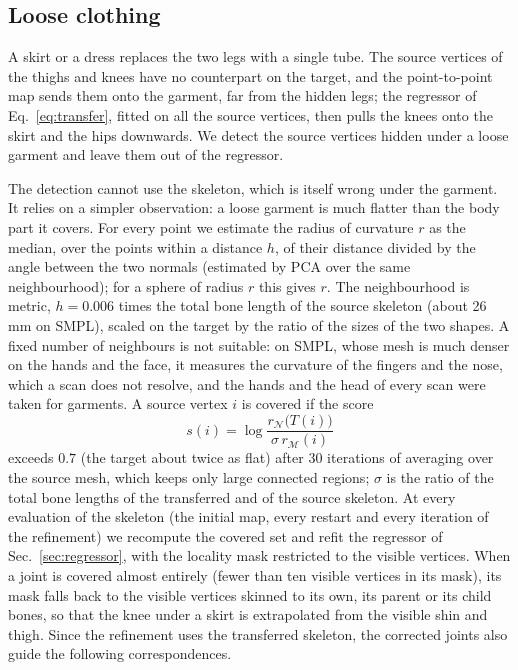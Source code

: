\documentclass[11pt]{article}
\newcommand{\M}{\mathcal{M}}
\newcommand{\N}{\mathcal{N}}
\begin{document}
\subsection{Loose clothing}
\label{sec:clothing}

A skirt or a dress replaces the two legs with a single tube. The source
vertices of the thighs and knees have no counterpart on the target, and the
point-to-point map sends them onto the garment, far from the hidden legs; the
regressor of Eq.~\eqref{eq:transfer}, fitted on all the source vertices, then
pulls the knees onto the skirt and the hips downwards. We detect the source
vertices hidden under a loose garment and leave them out of the regressor.

The detection cannot use the skeleton, which is itself wrong under the
garment. It relies on a simpler observation: a loose garment is much flatter
than the body part it covers. For every point we estimate the radius of
curvature $r$ as the median, over the points within a distance $h$, of their
distance divided by the angle between the two normals (estimated by PCA over
the same neighbourhood); for a sphere of radius $r$ this gives $r$. The
neighbourhood is metric, $h = 0.006$ times the total bone length of the
source skeleton (about 26\,mm on SMPL), scaled on the target by the ratio of
the sizes of the two shapes. A fixed number of neighbours is not suitable: on
SMPL, whose mesh is much denser on the hands and the face, it measures the
curvature of the fingers and the nose, which a scan does not resolve, and the
hands and the head of every scan were taken for garments. A source vertex $i$
is covered if the score
\begin{equation}
  s(i) = \log \frac{r_\N\big(T(i)\big)}{\sigma\, r_\M(i)}
\end{equation}
exceeds $0.7$ (the target about twice as flat) after 30 iterations of
averaging over the source mesh, which keeps only large connected regions;
$\sigma$ is the ratio of the total bone lengths of the transferred and of the
source skeleton. At every evaluation of the skeleton (the initial map, every
restart and every iteration of the refinement) we recompute the covered set
and refit the regressor of Sec.~\ref{sec:regressor}, with the locality mask
restricted to the visible vertices. When a joint is covered almost entirely
(fewer than ten visible vertices in its mask), its mask falls back to the
visible vertices skinned to its own, its parent or its child bones, so that
the knee under a skirt is extrapolated from the visible shin and thigh. Since
the refinement uses the transferred skeleton, the corrected joints also guide
the following correspondences.
\end{document}
